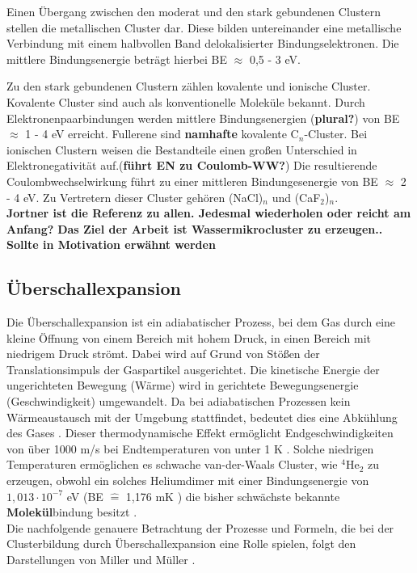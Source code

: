  Einen Übergang zwischen den moderat und den stark gebundenen Clustern stellen die metallischen Cluster dar. Diese bilden untereinander eine metallische Verbindung mit einem halbvollen Band delokalisierter Bindungselektronen. Die mittlere Bindungsenergie beträgt hierbei BE $\approx$ 0,5 - 3 eV.
 
 Zu den stark gebundenen Clustern zählen kovalente und ionische Cluster.
 Kovalente Cluster sind auch als konventionelle Moleküle bekannt. Durch Elektronenpaarbindungen  werden mittlere Bindungsenergien (\textbf{plural?}) von BE $\approx$ 1 - 4 eV erreicht. Fullerene sind \textbf{namhafte} kovalente C$_n$-Cluster. 
 Bei ionischen Clustern weisen die Bestandteile einen großen Unterschied in Elektronegativität auf.(\textbf{führt EN zu Coulomb-WW?}) Die resultierende Coulombwechselwirkung führt zu einer mittleren Bindungesenergie von BE $\approx$ 2 - 4 eV. Zu Vertretern dieser Cluster gehören (NaCl)$_n$ und (CaF$_2$)$_n$.\\
 \textbf{Jortner ist die Referenz zu allen. Jedesmal wiederholen oder reicht am Anfang?}
\textbf{Das Ziel der Arbeit ist Wassermikrocluster zu erzeugen.. Sollte in Motivation erwähnt werden}

\subsection{Überschallexpansion} \label{sec:uberschallexp}

Die Überschallexpansion ist ein adiabatischer Prozess, bei dem Gas durch eine kleine Öffnung von einem Bereich mit hohem Druck, in einen Bereich mit niedrigem Druck strömt. Dabei wird auf Grund von Stößen der Translationsimpuls der Gaspartikel ausgerichtet. Die kinetische Energie der ungerichteten Bewegung (Wärme) wird in gerichtete Bewegungsenergie (Geschwindigkeit) umgewandelt. Da bei adiabatischen Prozessen kein Wärmeaustausch mit der Umgebung stattfindet, bedeutet dies eine Abkühlung des Gases \cite{Vielteilch92}. Dieser thermodynamische Effekt ermöglicht Endgeschwindigkeiten von über 1000 m/s bei Endtemperaturen von unter 1 K \cite{mueller12}. 
Solche niedrigen Temperaturen ermöglichen es schwache van-der-Waals Cluster, wie  $\mathrm{^4}\mathrm{He}_2$ zu erzeugen, obwohl ein solches Heliumdimer mit einer Bindungsenergie von $\mathrm{1,013 \cdot 10^{-7}}$ eV (BE $\widehat{=}$ 1,176 mK \cite{Lohr2007}) die bisher schwächste bekannte \textbf{Molekül}bindung besitzt \cite{Luo1993}. \\
Die nachfolgende genauere Betrachtung der Prozesse und Formeln, die bei der Clusterbildung durch Überschallexpansion eine Rolle spielen, folgt den Darstellungen von Miller \cite{scoles1988} und Müller \cite{mul13}.

